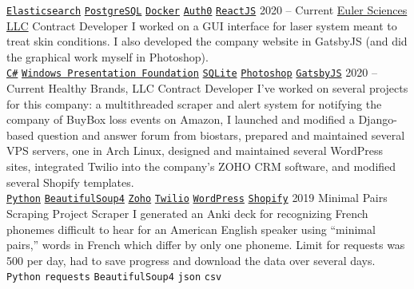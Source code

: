 \documentclass[9pt]{developercv} %
\begin{document}
\begin{entrylist}
{        \texttt{{\href{https://www.elastic.co/}{Elasticsearch}}}\slashsep
        \texttt{{\href{https://www.postgresql.org/}{PostgreSQL}}}\slashsep
        \texttt{{\href{https://www.docker.com/}{Docker}}}\slashsep
        \texttt{{\href{https://auth0.com/}{Auth0}}}\slashsep
        \texttt{{\href{https://reactjs.org/}{ReactJS}}}
        }
    \entry
        {2020 -- Current}
        {\href{https://euler-sci.com}{Euler Sciences LLC}}
        {Contract Developer}
        {I worked on a GUI interface for laser system meant to treat skin
        conditions. I also developed the company website in GatsbyJS (and did
        the graphical work myself in Photoshop).
        \\
        \texttt{{\href{https://en.wikipedia.org/wiki/C_Sharp_(programming_language)}{C\#}}}\slashsep
        \texttt{{\href{https://en.wikipedia.org/wiki/Windows_Presentation_Foundation}{Windows Presentation Foundation}}}\slashsep
        \texttt{{\href{https://www.sqlite.org/index.html}{SQLite}}}\slashsep
        \texttt{{\href{https://www.adobe.com/products/photoshop.html}{Photoshop}}}\slashsep
        \texttt{{\href{https://www.gatsbyjs.org/}{GatsbyJS}}}
        }
    \entry
        {2020 -- Current}
        {Healthy Brands, LLC}
        {Contract Developer}
        {
            I've worked on several projects for this company: a multithreaded
            scraper and alert system for notifying the company of BuyBox loss
            events on Amazon, I launched and modified a Django-based question
            and answer forum from biostars, prepared and maintained several VPS
            servers, one in Arch Linux, designed and maintained several
            WordPress sites, integrated Twilio into the company's ZOHO CRM
            software, and modified several Shopify templates.
        \\
        \texttt{{\href{https://www.python.org/}{Python}}}\slashsep
        \texttt{{\href{https://www.crummy.com/software/BeautifulSoup/bs4/doc/}{BeautifulSoup4}}}\slashsep
        \texttt{{\href{https://www.zoho.com/}{Zoho}}}\slashsep
        \texttt{{\href{https://www.twilio.com/}{Twilio}}}\slashsep
        \texttt{{\href{https://wordpress.org/}{WordPress}}}\slashsep
        \texttt{{\href{https://www.shopify.com/}{Shopify}}}
        }
    \entry
		{2019}
		{Minimal Pairs Scraping Project}
		{Scraper}
        {I generated an Anki deck for recognizing French phonemes difficult to
        hear for an American English speaker using “minimal pairs,” words in
        French which differ by only one phoneme. Limit for requests was 500 per
        day, had to save progress and download the data over several days.
        \\
        \texttt{Python}\slashsep
        \texttt{requests}\slashsep
        \texttt{BeautifulSoup4}\slashsep
        \texttt{json}\slashsep
        \texttt{csv}
        }
\end{entrylist}
\end{document}
